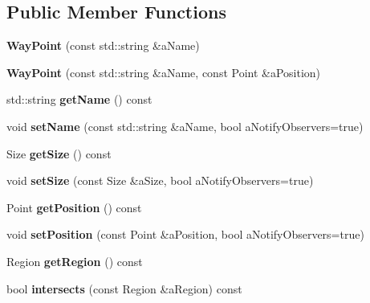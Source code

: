 \subsection*{Public Member Functions}
\begin{DoxyCompactItemize}
\item 
{\bfseries Way\+Point} (const std\+::string \&a\+Name)\hypertarget{class_model_1_1_way_point_a70f8825f3cd0071c61be7dbabd957334}{}\label{class_model_1_1_way_point_a70f8825f3cd0071c61be7dbabd957334}

\item 
{\bfseries Way\+Point} (const std\+::string \&a\+Name, const Point \&a\+Position)\hypertarget{class_model_1_1_way_point_a4c4b8340bf9b9553f411a337a3d11466}{}\label{class_model_1_1_way_point_a4c4b8340bf9b9553f411a337a3d11466}

\item 
std\+::string {\bfseries get\+Name} () const \hypertarget{class_model_1_1_way_point_ad941861604a21f01e2c6c3836aaecc50}{}\label{class_model_1_1_way_point_ad941861604a21f01e2c6c3836aaecc50}

\item 
void {\bfseries set\+Name} (const std\+::string \&a\+Name, bool a\+Notify\+Observers=true)\hypertarget{class_model_1_1_way_point_a436222b246b29ca5af7a6b56ca983435}{}\label{class_model_1_1_way_point_a436222b246b29ca5af7a6b56ca983435}

\item 
Size {\bfseries get\+Size} () const \hypertarget{class_model_1_1_way_point_a4c8a6165c661efd3182d58174f00c4f3}{}\label{class_model_1_1_way_point_a4c8a6165c661efd3182d58174f00c4f3}

\item 
void {\bfseries set\+Size} (const Size \&a\+Size, bool a\+Notify\+Observers=true)\hypertarget{class_model_1_1_way_point_ab21868d4ea0aaca73130b8195482a711}{}\label{class_model_1_1_way_point_ab21868d4ea0aaca73130b8195482a711}

\item 
Point {\bfseries get\+Position} () const \hypertarget{class_model_1_1_way_point_a75120951ffb56d4f4cafb042013c757f}{}\label{class_model_1_1_way_point_a75120951ffb56d4f4cafb042013c757f}

\item 
void {\bfseries set\+Position} (const Point \&a\+Position, bool a\+Notify\+Observers=true)\hypertarget{class_model_1_1_way_point_a174d63b3a9b11d03ec31ed3841280814}{}\label{class_model_1_1_way_point_a174d63b3a9b11d03ec31ed3841280814}

\item 
Region {\bfseries get\+Region} () const \hypertarget{class_model_1_1_way_point_a383c2c26ff883a788f3829c66929b4b7}{}\label{class_model_1_1_way_point_a383c2c26ff883a788f3829c66929b4b7}

\item 
bool {\bfseries intersects} (const Region \&a\+Region) const \hypertarget{class_model_1_1_way_point_a6ba9b3c6eae47ebf8943862619a4c435}{}\label{class_model_1_1_way_point_a6ba9b3c6eae47ebf8943862619a4c435}

\end{DoxyCompactItemize}
